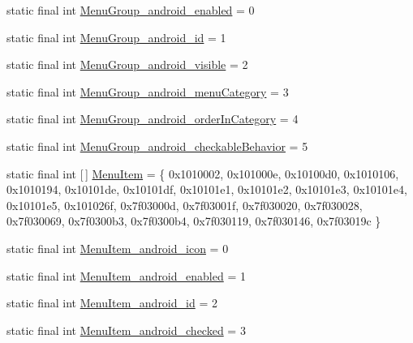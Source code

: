 \begin{DoxyCompactItemize}
\item 
static final int \mbox{\hyperlink{classcom_1_1synnapps_1_1carouselview_1_1_r_1_1styleable_ab49cbbb954416fe930a60e9cc618a1ab}{Menu\+Group\+\_\+android\+\_\+enabled}} = 0
\item 
static final int \mbox{\hyperlink{classcom_1_1synnapps_1_1carouselview_1_1_r_1_1styleable_a9f7a0b7537e134bfce5d57107039ce10}{Menu\+Group\+\_\+android\+\_\+id}} = 1
\item 
static final int \mbox{\hyperlink{classcom_1_1synnapps_1_1carouselview_1_1_r_1_1styleable_a5997257d42a5514a8770bd31674ff3f2}{Menu\+Group\+\_\+android\+\_\+visible}} = 2
\item 
static final int \mbox{\hyperlink{classcom_1_1synnapps_1_1carouselview_1_1_r_1_1styleable_adbd756fcec9fc2face72fed693e5e742}{Menu\+Group\+\_\+android\+\_\+menu\+Category}} = 3
\item 
static final int \mbox{\hyperlink{classcom_1_1synnapps_1_1carouselview_1_1_r_1_1styleable_a76c4eaef60a5e2acb47b3f076ede0456}{Menu\+Group\+\_\+android\+\_\+order\+In\+Category}} = 4
\item 
static final int \mbox{\hyperlink{classcom_1_1synnapps_1_1carouselview_1_1_r_1_1styleable_ae1e7449762e50932eb214277ebc988a9}{Menu\+Group\+\_\+android\+\_\+checkable\+Behavior}} = 5
\item 
static final int \mbox{[}$\,$\mbox{]} \mbox{\hyperlink{classcom_1_1synnapps_1_1carouselview_1_1_r_1_1styleable_a2c3337373725b62c0c97a2bb0d47539c}{Menu\+Item}} = \{ 0x1010002, 0x101000e, 0x10100d0, 0x1010106, 0x1010194, 0x10101de, 0x10101df, 0x10101e1, 0x10101e2, 0x10101e3, 0x10101e4, 0x10101e5, 0x101026f, 0x7f03000d, 0x7f03001f, 0x7f030020, 0x7f030028, 0x7f030069, 0x7f0300b3, 0x7f0300b4, 0x7f030119, 0x7f030146, 0x7f03019c \}
\item 
static final int \mbox{\hyperlink{classcom_1_1synnapps_1_1carouselview_1_1_r_1_1styleable_a555e5a5df42d3281593b25f9f1749d5d}{Menu\+Item\+\_\+android\+\_\+icon}} = 0
\item 
static final int \mbox{\hyperlink{classcom_1_1synnapps_1_1carouselview_1_1_r_1_1styleable_abbd32b505b6de3f521082d70ccdccce7}{Menu\+Item\+\_\+android\+\_\+enabled}} = 1
\item 
static final int \mbox{\hyperlink{classcom_1_1synnapps_1_1carouselview_1_1_r_1_1styleable_a39bae5c4816356aa8da640a40f1b48df}{Menu\+Item\+\_\+android\+\_\+id}} = 2
\item 
static final int \mbox{\hyperlink{classcom_1_1synnapps_1_1carouselview_1_1_r_1_1styleable_ad576009d31e75317c43f7dbdcd25b2ba}{Menu\+Item\+\_\+android\+\_\+checked}} = 3

\end{DoxyCompactItemize}
